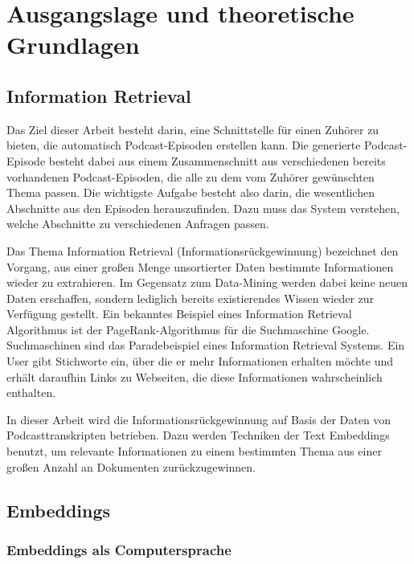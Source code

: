 \chapter{Ausgangslage und theoretische Grundlagen}\label{ch:theoretical}

\section{Information Retrieval}

Das Ziel dieser Arbeit besteht darin, eine Schnittstelle für einen Zuhörer zu bieten, die automatisch Podcast-Episoden erstellen kann. 
Die generierte Podcast-Episode besteht dabei aus einem Zusammenschnitt aus verschiedenen bereits vorhandenen Podcast-Episoden, die alle zu dem vom Zuhörer gewünschten Thema passen.
Die wichtigste Aufgabe besteht also darin, die wesentlichen Abschnitte aus den Episoden herauszufinden.
Dazu muss das System verstehen, welche Abschnitte zu verschiedenen Anfragen passen.

Das Thema Information Retrieval (Informationsrückgewinnung) bezeichnet den Vorgang, aus einer großen Menge unsortierter Daten bestimmte Informationen wieder zu extrahieren.
Im Gegensatz zum Data-Mining werden dabei keine neuen Daten erschaffen, sondern lediglich bereits existierendes Wissen wieder zur Verfügung gestellt.
Ein bekanntes Beispiel eines Information Retrieval Algorithmus ist der PageRank-Algorithmus für die Suchmaschine Google.
Suchmaschinen sind das Paradebeispiel eines Information Retrieval Systems.
Ein User gibt Stichworte ein, über die er mehr Informationen erhalten möchte und erhält daraufhin Links zu Webseiten, die diese Informationen wahrscheinlich enthalten.

In dieser Arbeit wird die Informationsrückgewinnung auf Basis der Daten von Podcasttranskripten betrieben.
Dazu werden Techniken der Text Embeddings benutzt, um relevante Informationen zu einem bestimmten Thema aus einer großen Anzahl an Dokumenten zurückzugewinnen.

\section{Embeddings}

\subsection{Embeddings als Computersprache}

